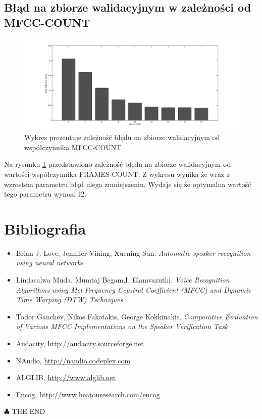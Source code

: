 \documentclass[a4paper]{article}
\begin{document}
	\subsection{Błąd na zbiorze walidacyjnym w zależności od MFCC-COUNT}
	\begin{figure}[h]	
  		\centering
		\includegraphics[width=\textwidth,trim= 3cm 0cm 3cm 0cm, clip]{./img/mfcc2}
  		\caption{Wykres prezentuje zależność błędu na zbiorze walidacyjnym od współczynnika
  		MFCC-COUNT}
  		\label{fig:mfcc2}
	\end{figure}
	Na rysunku \ref{fig:mfcc2} przedstawiono zależność błędu na zbiorze walidacyjnym od wartości 
	współczynnika FRAMES-COUNT. Z wykresu wynika że wraz z wzrostem parametru błąd ulega zmniejszeniu.
	Wydaje się że optymalna wartość tego parametru wynosi 12.
		
\section*{Bibliografia}
	\begin{itemize}
		\item
			Brian J. Love, Jennifer Vining, Xuening Sun. \textit{Automatic speaker recognition using neural networks}
		\item Lindasalwa Muda, Mumtaj Begam,I. Elamvazuthi. \textit{Voice Recognition Algorithms using Mel Frequency Cepstral Coefficient (MFCC) and Dynamic Time Warping (DTW) Techniques}
		\item
			Todor Ganchev, Nikos Fakotakis, George Kokkinakis. \textit{Comparative Evaluation of Various MFCC Implementations on the Speaker Verification Task}
		\item
			Audacity, \url{http://audacity.sourceforge.net}
		\item	
			NAudio, \url{http://naudio.codeplex.com} 
		\item
			ALGLIB, \url{http://www.alglib.net}
		\item
			Encog, \url{http://www.heatonresearch.com/encog}
	\end{itemize}
	
	\vfill
	\begin{flushright}
	$\clubsuit$ \textsc{THE END}
	\end{flushright}
\end{document}
